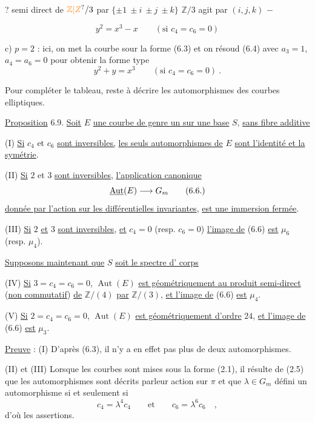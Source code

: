  ? semi direct de $\unsure{\mathbb{Z}|Z}/3$ par $\{\pm1\ \pm i\ \pm j\ \pm k\}$  $\mathbb{Z}/3$ agit par $(i,j,k)$ \quad $-$


\[
y^2=x^3-x\qquad(\text{si }c_4=c_6=0)\tag*{(6.7)}
\]

c) $p=2$ : ici, on met la courbe sour la forme (6.3) et on résoud (6.4) avec $a_3=1$, $a_4=a_6=0$ pour obtenir la forme type
\[
y^2+y=x^3\qquad(\text{si }c_4=c_6=0)\ .\tag*{(6.8)}
\]

Pour compléter le tableau, reste à décrire les automorphismes des courbes elliptiques.

\uline{Proposition} 6.9. \uline{Soit} $E$ \uline{une courbe de genre un sur une base} $S$, \uline{sans fibre additive}

(I) \uline{Si} $c_4$ et $c_6$ \uline{sont inversibles,} \uline{les seuls automorphismes de} $E$ \uline{sont l'identité et la symétrie}.

(II) \uline{Si} $2$ et $3$ \uline{sont inversibles}, \uline{l'application canonique}
\[
\underline{\operatorname{Aut}}(E)\longrightarrow G_m\tag*{(6.6.)}
\]
\uline{donnée par l'action sur les différentielles invariantes}, \uline{est une immersion fermée}.

(III) \uline{Si} $2$ \uline{et} $3$ \uline{sont inversibles}, \uline{et} $c_4=0$ (resp. $c_6=0$) \uline{l'image de} (6.6) \uline{est} $\mu_6$ (resp. $\mu_4$).

\uline{Supposons maintenant que} $S$ \uline{soit le spectre d' corps}

(IV) \uline{Si} $3=c_4=c_6=0$, $\operatorname{Aut}(E)$ \uline{est géométriquement  au produit semi-direct} (\uline{non commutatif}) \uline{de} $\mathbb{Z}/(4)$ \uline{par} $\mathbb{Z}/(3)$, \uline{et l'image de} (6.6) \uline{est} $\mu_4$.

(V) \uline{Si} $2=c_4=c_6=0$, $\operatorname{Aut}(E)$ \uline{est géométriquement d'ordre} $24$, \uline{et l'image de} (6.6) \uline{est} $\mu_3$.


\uline{Preuve} : (I) D'après (6.3), il n'y a en effet pas plus de deux automorphismes.

(II) et (III) Lorsque les courbes sont mises sous la forme (2.1), il résulte de (2.5) que les automorphismes sont décrits parleur action sur $\pi$ et que $\lambda\in G_m$ défini un automorphisme si et seulement si
\[
c_4=\lambda^4c_4\qquad\text{et}\qquad c_6=\lambda^6c_6\quad,
\]
d'où les assertions.

